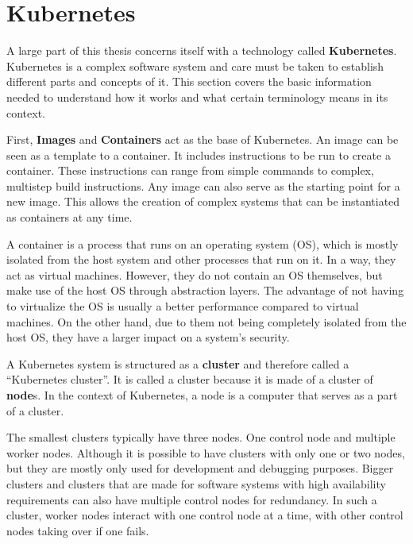 \section{Kubernetes}\label{sec:kubernetes}

A large part of this thesis concerns itself with a technology called \textbf{Kubernetes}.
Kubernetes is a complex software system and care must be taken to establish different parts and concepts of it.
This section covers the basic information needed to understand how it works and what certain terminology means in its context.

First, \textbf{Images} and \textbf{Containers}\cite{docker-image,kubernetes-images,kubernetes-containers} act as the base of Kubernetes.
An image can be seen as a template to a container.
It includes instructions to be run to create a container.
These instructions can range from simple commands to complex, multistep build instructions.
Any image can also serve as the starting point for a new image.
This allows the creation of complex systems that can be instantiated as containers at any time.

\pagebreak

A container\cite{what-are-linux-containers} is a process that runs on an operating system (OS), which is mostly isolated from the host system and other processes that run on it.
In a way, they act as virtual machines.
However, they do not contain an OS themselves, but make use of the host OS through abstraction layers.
The advantage of not having to virtualize the OS is usually a better performance compared to virtual machines.
On the other hand, due to them not being completely isolated from the host OS, they have a larger impact on a system's security.

A Kubernetes system is structured as a \textbf{cluster} and therefore called a ``Kubernetes cluster''\cite{kubernetes-cluster}.
It is called a cluster because it is made of a cluster of \textbf{node}s.
In the context of Kubernetes, a node is a computer that serves as a part of a cluster.

The smallest clusters typically have three nodes\cite{kubernetes-cluster}.
One control node and multiple worker nodes.
Although it is possible to have clusters with only one or two nodes, but they are mostly only used for development and debugging purposes\cite{minikube}.
Bigger clusters and clusters that are made for software systems with high availability requirements can also have multiple control nodes for redundancy.
In such a cluster, worker nodes interact with one control node at a time, with other control nodes taking over if one fails.

